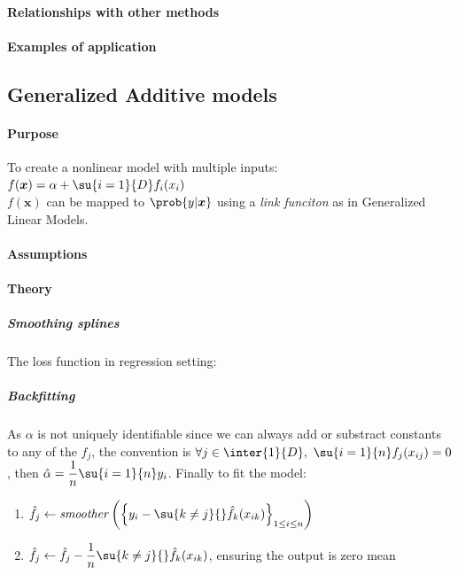\paragraph{Relationships with other methods}
\paragraph{Examples of application}

\subsection{Generalized Additive models}
\paragraph{Purpose}
To create a nonlinear model with multiple inputs: $f(\bm{x}) = \alpha + \su{i=1}{D}f_{
i}(x_{i})$\\
$f(\bm{x})$ can be mapped to $\prob{y|\bm{x}}$ using a \emph{link funciton} as in Generalized Linear
Models.
\paragraph{Assumptions}
\paragraph{Theory}
\subparagraph{Smoothing splines}
The loss function in regression setting:
\begin{center}
\end{center}
\subparagraph{Backfitting}
As $\alpha$ is not uniquely identifiable since we can always add or substract constants to any of 
the $f_{j}$, the convention is $\forall j\in\inter{1}{D},~\su{i=1}{n}f_{j}(x_{ij})=0$, then
$\hat{\alpha} = \dfrac{1}{n}\su{i=1}{n}y_{i}$.
Finally to fit the model:
\begin{enumerate}
    \item $\hat{f}_{j} \leftarrow \text{\emph{smoother}}\left(\left\{y_{i} - \su{k\neq j}{}\hat{f}_{
                k}(x_{ik})\right\}_{1\leq i\leq n}\right)$
        \item $\hat{f}_{j} \leftarrow \hat{f}_{j}- \dfrac{1}{n}\su{k\neq j}{}\hat{f}_{k}(x_{ik})$,
            ensuring the output is zero mean
\end{enumerate}


